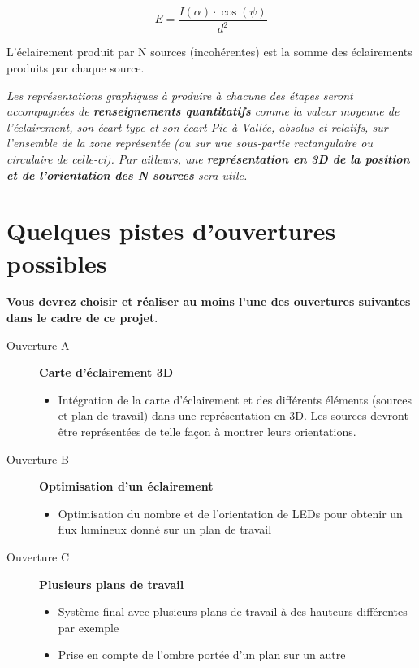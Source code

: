 $$E = \frac{I(\alpha) \cdot \cos(\psi)}{d^2}$$



L'éclairement produit par N sources (incohérentes) est la somme des éclairements produits par chaque source.

\medskip


\textit{Les représentations graphiques à produire à chacune des étapes seront accompagnées de \textbf{renseignements quantitatifs} comme la valeur moyenne de l'éclairement, son écart-type et son écart Pic à Vallée, absolus et relatifs, sur l'ensemble de la zone représentée (ou sur une sous-partie rectangulaire ou circulaire de celle-ci). Par ailleurs, une \textbf{représentation en 3D de la position et de l'orientation des N sources} sera utile.}


\section{Quelques pistes d'ouvertures possibles}

\textbf{Vous devrez choisir et réaliser au moins l'une des ouvertures suivantes dans le cadre de ce projet}.

\begin{description}

	\item[Ouverture A] \textbf{Carte d'éclairement 3D}
	
	\begin{itemize}
		\item Intégration de la carte d'éclairement et des différents éléments (sources et plan de travail) dans une représentation en 3D. Les sources devront être représentées de telle façon à montrer leurs orientations.
	\end{itemize}	

\qquad

	\item[Ouverture B] \textbf{Optimisation d'un éclairement}
	
	\begin{itemize}
		\item Optimisation du nombre et de l'orientation de LEDs pour obtenir un flux lumineux donné sur un plan de travail
	\end{itemize}	

\qquad
	
	\item[Ouverture C] \textbf{Plusieurs plans de travail}
	\begin{itemize}
		\item Système final avec plusieurs plans de travail à des hauteurs différentes par exemple
		\item Prise en compte de l'ombre portée d'un plan sur un autre
	\end{itemize}
	
\end{description}


